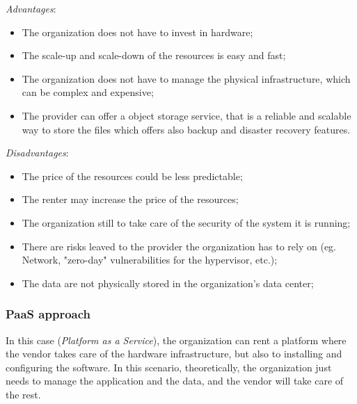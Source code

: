 \textit{Advantages}:
\begin{itemize}
    \itemsep0em
    \item The organization does not have to invest in hardware;
    \item The scale-up and scale-down of the resources is easy and fast;
    \item The organization does not have to manage the physical infrastructure, which can be complex and expensive;
    \item The provider can offer a object storage service, that is a reliable and scalable way to store the files which offers also backup and disaster recovery features.
\end{itemize}
\textit{Disadvantages}:
\begin{itemize}
    \itemsep0em
    \item The price of the resources could be less predictable; 
    \item The renter may increase the price of the resources;
    \item The organization still to take care of the security of the system it is running;
    \item There are risks leaved to the provider the organization has to rely on (eg. Network, "zero-day" vulnerabilities for the hypervisor, etc.);
    \item The data are not physically stored in the organization's data center;
\end{itemize}

\subsubsection{PaaS approach}
\label{subsubsec:paas}
In this case (\textit{Platform as a Service}), the organization can rent a platform where the vendor takes care of the hardware infrastructure, but also to installing and configuring the software.
In this scenario, theoretically, the organization just needs to manage the application and the data, and the vendor will take care of the rest.

